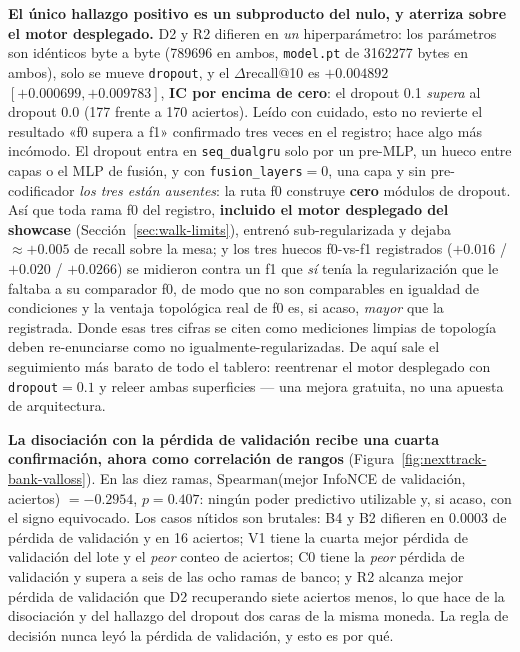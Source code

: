 \documentclass[11pt]{article}
\begin{document}
\textbf{El único hallazgo positivo es un subproducto del nulo, y aterriza sobre el
motor desplegado.} D2 y R2 difieren en \emph{un} hiperparámetro: los parámetros
son idénticos byte a byte (\num{789696} en ambos, \texttt{model.pt} de
\num{3162277} bytes en ambos), solo se mueve \texttt{dropout}, y el
$\Delta$recall@10 es $+\num{0.004892}$
$[+\num{0.000699},+\num{0.009783}]$, \textbf{IC por encima de cero}: el dropout
\num{0.1} \emph{supera} al dropout \num{0.0} (\num{177} frente a \num{170}
aciertos). Leído con cuidado, esto no revierte el resultado «f0 supera a f1»
confirmado tres veces en el registro; hace algo más incómodo. El dropout entra en
\texttt{seq\_dualgru} solo por un pre-MLP, un hueco entre capas o el MLP de
fusión, y con \texttt{fusion\_layers}${}=0$, una capa y sin pre-codificador
\emph{los tres están ausentes}: la ruta f0 construye \textbf{cero} módulos de
dropout. Así que toda rama f0 del registro, \textbf{incluido el motor desplegado
del showcase} (Sección~\ref{sec:walk-limits}), entrenó sub-regularizada y dejaba
${\approx}+\num{0.005}$ de recall sobre la mesa; y los tres huecos f0-vs-f1
registrados ($+\num{0.016}$ / $+\num{0.020}$ / $+\num{0.0266}$) se midieron contra
un f1 que \emph{sí} tenía la regularización que le faltaba a su comparador f0, de
modo que no son comparables en igualdad de condiciones y la ventaja topológica
real de f0 es, si acaso, \emph{mayor} que la registrada. Donde esas tres cifras se
citen como mediciones limpias de topología deben re-enunciarse como no
igualmente-regularizadas. De aquí sale el seguimiento más barato de todo el
tablero: reentrenar el motor desplegado con \texttt{dropout}${}=\num{0.1}$ y
releer ambas superficies --- una mejora gratuita, no una apuesta de arquitectura.

\textbf{La disociación con la pérdida de validación recibe una cuarta
confirmación, ahora como correlación de rangos}
(Figura~\ref{fig:nexttrack-bank-valloss}). En las diez ramas,
Spearman(mejor InfoNCE de validación, aciertos) $=-\num{0.2954}$,
$p=\num{0.407}$: ningún poder predictivo utilizable y, si acaso, con el signo
equivocado. Los casos nítidos son brutales: B4 y B2 difieren en \num{0.0003} de
pérdida de validación y en \num{16} aciertos; V1 tiene la cuarta mejor pérdida de
validación del lote y el \emph{peor} conteo de aciertos; C0 tiene la \emph{peor}
pérdida de validación y supera a seis de las ocho ramas de banco; y R2 alcanza
mejor pérdida de validación que D2 recuperando siete aciertos menos, lo que hace
de la disociación y del hallazgo del dropout dos caras de la misma moneda. La
regla de decisión nunca leyó la pérdida de validación, y esto es por qué.
\end{document}
